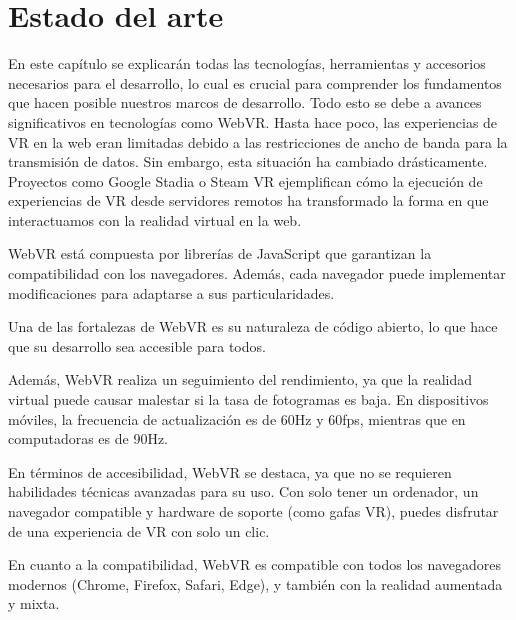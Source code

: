 \documentclass[a4paper, 12pt]{book}
\begin{document}

\cleardoublepage
\chapter{Estado del arte}
\label{chap:estado}

En este capítulo se explicarán todas las tecnologías, herramientas y accesorios necesarios para el desarrollo, lo cual es crucial para 
comprender los fundamentos que hacen posible nuestros marcos de desarrollo. Todo esto se debe a avances significativos en tecnologías como WebVR. 
Hasta hace poco, las experiencias de VR en la web eran limitadas debido a las restricciones de ancho de banda para la transmisión de datos. 
Sin embargo, esta situación ha cambiado drásticamente. Proyectos como Google Stadia o Steam VR ejemplifican cómo la ejecución de experiencias de VR 
desde servidores remotos ha transformado la forma en que interactuamos con la realidad virtual en la web.

\bigskip

WebVR está compuesta por librerías de JavaScript que garantizan la compatibilidad con los navegadores. Además, cada navegador puede implementar 
modificaciones para adaptarse a sus particularidades.

\bigskip

Una de las fortalezas de WebVR es su naturaleza de código abierto, lo que hace que su desarrollo sea accesible para todos.

\bigskip

Además, WebVR realiza un seguimiento del rendimiento, ya que la realidad virtual puede causar malestar si la tasa de fotogramas es baja. En dispositivos 
móviles, la frecuencia de actualización es de 60Hz y 60fps, mientras que en computadoras es de 90Hz.

\bigskip

En términos de accesibilidad, WebVR se destaca, ya que no se requieren habilidades técnicas avanzadas para su uso. Con solo tener un ordenador, 
un navegador compatible y hardware de soporte (como gafas VR), puedes disfrutar de una experiencia de VR con solo un clic.

\bigskip

En cuanto a la compatibilidad, WebVR es compatible con todos los navegadores modernos (Chrome, Firefox, Safari, Edge), y también con la realidad 
aumentada y mixta.
\end{document}
